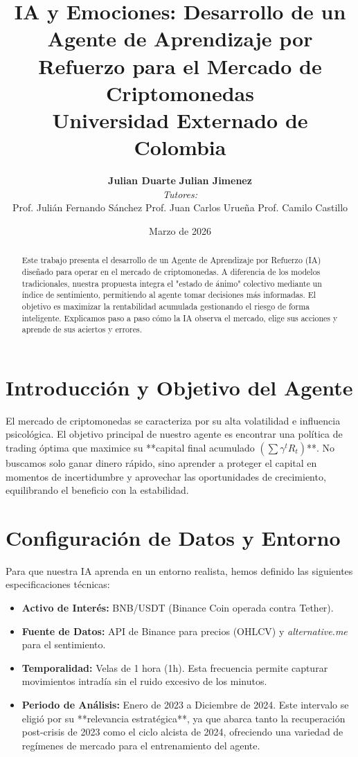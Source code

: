 \documentclass[12pt,a4paper]{article}
\title{
    \vspace{-1cm}
    \textbf{\Large IA y Emociones: Desarrollo de un Agente de Aprendizaje por Refuerzo para el Mercado de Criptomonedas} \\
    \vspace{0.5cm}
    \large Universidad Externado de Colombia \\
    \text{Ciencia de Datos -- Departamento de Matemáticas}
}
\author{
    \textbf{Julian Duarte} \quad \textbf{Julian Jimenez} \\
    \medskip
    \small \textit{Tutores:} \\
    \small Prof. Julián Fernando Sánchez \quad Prof. Juan Carlos Urueña \quad Prof. Camilo Castillo
}
\date{Marzo de 2026}
\begin{document}
\maketitle

\begin{abstract}
    Este trabajo presenta el desarrollo de un Agente de Aprendizaje por Refuerzo (IA) diseñado para operar en el mercado de criptomonedas. A diferencia de los modelos tradicionales, nuestra propuesta integra el "estado de ánimo" colectivo mediante un índice de sentimiento, permitiendo al agente tomar decisiones más informadas. El objetivo es maximizar la rentabilidad acumulada gestionando el riesgo de forma inteligente. Explicamos paso a paso cómo la IA observa el mercado, elige sus acciones y aprende de sus aciertos y errores.
\end{abstract}

\section{Introducción y Objetivo del Agente}
El mercado de criptomonedas se caracteriza por su alta volatilidad e influencia psicológica. El objetivo principal de nuestro agente es encontrar una política de trading óptima que maximice su **capital final acumulado $(\sum \gamma^t R_t)$**. No buscamos solo ganar dinero rápido, sino aprender a proteger el capital en momentos de incertidumbre y aprovechar las oportunidades de crecimiento, equilibrando el beneficio con la estabilidad.

\section{Configuración de Datos y Entorno}
Para que nuestra IA aprenda en un entorno realista, hemos definido las siguientes especificaciones técnicas:
\begin{itemize}
    \item \textbf{Activo de Interés:} BNB/USDT (Binance Coin operada contra Tether).
    \item \textbf{Fuente de Datos:} API de Binance para precios (OHLCV) y \textit{alternative.me} para el sentimiento.
    \item \textbf{Temporalidad:} Velas de 1 hora (1h). Esta frecuencia permite capturar movimientos intradía sin el ruido excesivo de los minutos.
    \item \textbf{Periodo de Análisis:} Enero de 2023 a Diciembre de 2024. Este intervalo se eligió por su **relevancia estratégica**, ya que abarca tanto la recuperación post-crisis de 2023 como el ciclo alcista de 2024, ofreciendo una variedad de regímenes de mercado para el entrenamiento del agente.
\end{itemize}
\end{document}
